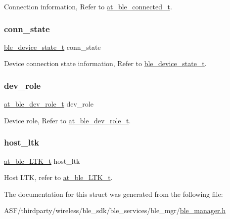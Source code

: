 Connection information, Refer to \mbox{\hyperlink{structat__ble__connected__t}{at\+\_\+ble\+\_\+connected\+\_\+t}}. 

\mbox{\label{structble__connected__dev__info_abc9eba5b7bb5964e72e0b46c131dcb42}} 
\subsubsection{\texorpdfstring{conn\_state}{conn\_state}}
{\footnotesize\ttfamily \mbox{\hyperlink{ble__manager_8h_abcdab7066ca2dc0d328ed5e555cdcf7c}{ble\+\_\+device\+\_\+state\+\_\+t}} conn\+\_\+state}



Device connection state information, Refer to \mbox{\hyperlink{ble__manager_8h_abcdab7066ca2dc0d328ed5e555cdcf7c}{ble\+\_\+device\+\_\+state\+\_\+t}}. 

\mbox{\label{structble__connected__dev__info_a43e61598480ee3f3e36813712de4dccb}} 
\subsubsection{\texorpdfstring{dev\_role}{dev\_role}}
{\footnotesize\ttfamily \mbox{\hyperlink{at__ble__api_8h_ad15e38aadd54f5fc3ab8a75b35ae476a}{at\+\_\+ble\+\_\+dev\+\_\+role\+\_\+t}} dev\+\_\+role}



Device role, Refer to \mbox{\hyperlink{at__ble__api_8h_ad15e38aadd54f5fc3ab8a75b35ae476a}{at\+\_\+ble\+\_\+dev\+\_\+role\+\_\+t}}. 

\mbox{\label{structble__connected__dev__info_ae4b4bc5db220b6da7c3757edf423186e}} 
\subsubsection{\texorpdfstring{host\_ltk}{host\_ltk}}
{\footnotesize\ttfamily \mbox{\hyperlink{structat__ble___l_t_k__t}{at\+\_\+ble\+\_\+\+L\+T\+K\+\_\+t}} host\+\_\+ltk}



Host L\+TK, refer to \mbox{\hyperlink{structat__ble___l_t_k__t}{at\+\_\+ble\+\_\+\+L\+T\+K\+\_\+t}}. 



The documentation for this struct was generated from the following file\+:\begin{DoxyCompactItemize}
\item 
A\+S\+F/thirdparty/wireless/ble\+\_\+sdk/ble\+\_\+services/ble\+\_\+mgr/\mbox{\hyperlink{ble__manager_8h}{ble\+\_\+manager.\+h}}\end{DoxyCompactItemize}
